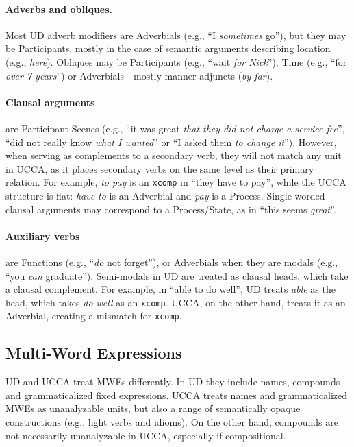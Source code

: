 \documentclass[11pt,a4paper,table]{article}
\begin{document}
\paragraph{Adverbs and obliques.}
    Most UD adverb modifiers are Adverbials (e.g., ``I \textit{sometimes} go''),
    but they may be Participants, mostly in the case of semantic arguments describing location (e.g., \textit{here}).
    Obliques
    may be
    Participants (e.g., ``wait \textit{for Nick}''), Time (e.g., ``for \textit{over 7 years}'') 
    or Adverbials---mostly manner adjuncts (\textit{by far}).

\paragraph{Clausal arguments}
    are Participant Scenes
    (e.g., ``it was great \textit{that they did not charge a service fee}'',
    ``did not really know \textit{what I wanted}'' or
    ``I asked them \textit{to change it}'').
    However, when serving as complements to a secondary verb, they
    will not match any unit in UCCA, as it places secondary verbs on the 
    same level as their primary relation. 
    For example, \textit{to pay} is an \texttt{xcomp} in ``they have to pay'', while
    the UCCA structure is flat: \textit{have to} is an Adverbial and \textit{pay} is a Process.
    Single-worded clausal arguments may correspond to a Process/State,
    as in ``this seems \textit{great}''.

\paragraph{Auxiliary verbs}
    are Functions (e.g., ``\textit{do} not forget''),
    or Adverbials when they are modals (e.g., ``you \textit{can} graduate''). Semi-modals 
    in UD are treated as clausal heads, which take a clausal complement. 
    For example, in ``able to do well'', UD treats \textit{able} as the head,
    which takes \textit{do well} as an \texttt{xcomp}. UCCA, on the other hand,
    treats it as an Adverbial, creating a mismatch for \texttt{xcomp}.
    

\subsection{Multi-Word Expressions}\label{sec:mwe}

UD and UCCA treat MWEs differently.
In UD they include names, compounds and grammaticalized fixed expressions.
UCCA treats names and grammaticalized MWEs as unanalyzable units,
but also a range of semantically opaque constructions
(e.g., light verbs and idioms).
On the other hand, compounds are not necessarily unanalyzable in UCCA,
especially if compositional.
\end{document}
